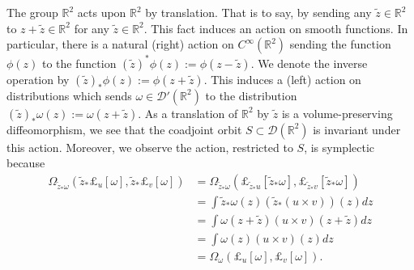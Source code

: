 \documentclass[12pt]{amsart}
\newcommand{\R}{\ensuremath{\mathbb{R}}}
\theoremstyle{remark}
\begin{document}
The group $\mathbb{R}^2$ acts upon $\mathbb{R}^2$ by translation.
That is to say, by sending any $\tilde{z} \in \R^2$ to $z + \tilde{z} \in \R^2$ for any $\tilde{z}  \in \R^2$.
This fact induces an action on smooth functions.
In particular, there is a natural (right) action on $C^{\infty}(\mathbb{R}^2)$ sending the function $\phi(z)$ to the function  $(\tilde{z})^*\phi(z) := \phi(z-\tilde{z})$.
We denote the inverse operation by $(\tilde{z})_* \phi(z) := \phi( z + \tilde{z})$.
This induces a (left) action on distributions which sends $\omega \in \mathcal{D}'(\R^2)$ to the distribution $(\tilde{z})_*\omega(z) := \omega( z +\tilde{z})$.
As a translation of $\mathbb{R}^2$ by $\tilde{z}$ is a volume-preserving diffeomorphism, we see that the coadjoint orbit $S \subset \mathcal{D}(\mathbb{R}^2)$ is invariant under this action.
Moreover, we observe the action, restricted to $S$, is symplectic because
\begin{align*}
  \Omega_{ \tilde{z}_* \omega}( \tilde{z}_*\pounds_{u}[ \omega] , \tilde{z}_*\pounds_v[\omega] ) &= \Omega_{\tilde{z}_* \omega} ( \pounds_{\tilde{z}_*u}[ \tilde{z}_*\omega] ,
  \pounds_{\tilde{z}_*v}[\tilde{z}_*\omega] ) \\
  &= \int \tilde{z}_* \omega(z)  \left( \tilde{z}_*(u \times v) \right)(z) dz \\
  &= \int \omega( z+\tilde{z}) \left(u \times v \right)(z + \tilde{z}) dz \\ 
  &= \int \omega(z) \left( u \times v \right)(z) dz  \\
  &= \Omega_{\omega}( \pounds_u[\omega], \pounds_v[\omega]).
\end{align*}
\end{document}
